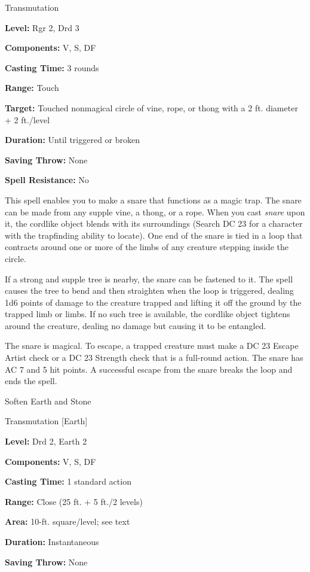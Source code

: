 \documentclass{article}
\begin{document}
Transmutation

\textbf{Level:} Rgr 2, Drd 3

\textbf{Components:} V, S, DF

\textbf{Casting Time:} 3 rounds

\textbf{Range:} Touch

\textbf{Target:} Touched nonmagical circle of vine, rope, or thong with a 2 ft. 
diameter + 2 ft./level

\textbf{Duration:} Until triggered or broken

\textbf{Saving Throw:} None

\textbf{Spell Resistance:} No

This spell enables you to make a snare that functions as a magic trap. The snare 
can be made from any supple vine, a thong, or a rope. When you cast \textit{snare 
}upon it, the cordlike object blends with its surroundings (Search DC 23 for a 
character with the trapfinding ability to locate). One end of the snare is tied 
in a loop that contracts around one or more of the limbs of any creature stepping 
inside the circle.

If a strong and supple tree is nearby, the snare can be fastened to it. The spell 
causes the tree to bend and then straighten when the loop is triggered, dealing 
1d6 points of damage to the creature trapped and lifting it off the ground by the 
trapped limb or limbs. If no such tree is available, the cordlike object tightens 
around the creature, dealing no damage but causing it to be entangled.

The snare is magical. To escape, a trapped creature must make a DC 23 Escape Artist 
check or a DC 23 Strength check that is a full-round action. The snare has AC 7 
and 5 hit points. A successful escape from the snare breaks the loop and ends the 
spell.

\vspace{12pt}
Soften Earth and Stone

Transmutation [Earth]

\textbf{Level:} Drd 2, Earth 2

\textbf{Components:} V, S, DF

\textbf{Casting Time:} 1 standard action

\textbf{Range:} Close (25 ft. + 5 ft./2 levels)

\textbf{Area:} 10-ft. square/level; see text

\textbf{Duration:} Instantaneous

\textbf{Saving Throw:} None
\end{document}
